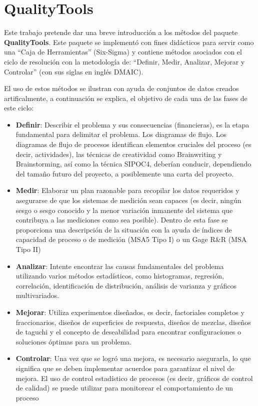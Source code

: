 \documentclass[
]{book}
\begin{document}
\hypertarget{qualitytools}{%
\chapter{QualityTools}\label{qualitytools}}

Este trabajo pretende dar una breve introducción a los métodos del paquete \textbf{QualityTools}. Este paquete se implementó con fines didácticos para servir como una ``Caja de Herramientas'' (Six-Sigma) y contiene métodos asociados con el ciclo de resolución con la metodología de: ``Definir, Medir, Analizar, Mejorar y Controlar'' (con sus siglas en inglés DMAIC).

El uso de estos métodos se ilustran con ayuda de conjuntos de datos creados artificalmente, a continuación se explica, el objetivo de cada una de las fases de este ciclo:

\begin{itemize}
\item
  \textbf{Definir}: Describir el problema y sus consecuencias (financieras), es la etapa fundamental para delimitar el problema. Los diagramas de flujo. Los diagramas de flujo de procesos identifican elementos cruciales del proceso (es decir, actividades), las técnicas de creatividad como Brainwriting y Brainstorming, así como la técnica SIPOC4, deberían conducir, dependiendo
  del tamaño futuro del proyecto, a posiblemente una carta del proyecto.
\item
  \textbf{Medir}: Elaborar un plan razonable para recopilar los datos requeridos y asegurarse de que los sistemas de medición sean capaces (es decir, ningún sesgo o sesgo conocido y la menor variación inmanente del sistema que
  contribuya a las mediciones como sea posible). Dentro de esta fase se proporciona una descripción de la situación con la ayuda de índices de capacidad de proceso o de medición (MSA5 Tipo I) o un Gage R\&R (MSA Tipo II)
\item
  \textbf{Analizar}: Intente encontrar las causas fundamentales del problema utilizando varios métodos estadísticos, como histogramas, regresión, correlación, identificación de distribución, análisis de varianza y gráficos multivariados.
\item
  \textbf{Mejorar}: Utiliza experimentos diseñados, es decir, factoriales completos y fraccionarios, diseños de superficies de respuesta, diseños de mezclas, diseños de taguchi y el concepto de deseabilidad para encontrar
  configuraciones o soluciones óptimas para un problema.
\item
  \textbf{Controlar}: Una vez que se logró una mejora, es necesario asegurarla, lo que significa que se deben implementar acuerdos para garantizar el nivel de mejora. El uso de control estadístico de procesos (es decir, gráficos de control de calidad) se puede utilizar para monitorear el comportamiento de un proceso
\end{itemize}
\end{document}
